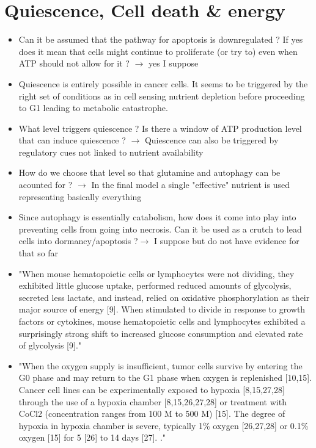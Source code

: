 \documentclass[11pt,a4paper]{article}
\begin{document}
\section{Quiescence, Cell death \& energy}
\begin{itemize}
\item Can it be assumed that the pathway for apoptosis is downregulated ? If yes does it mean that cells might continue to proliferate (or try to) even when ATP should not allow for it ? $\rightarrow$ yes I suppose
\item Quiescence is entirely possible in cancer cells. It seems to be triggered by the right set of conditions as in cell sensing nutrient depletion before proceeding to G1 leading to metabolic catastrophe.
\item What level triggers quiescence ? Is there a window of ATP production level that can induce quiescence ? $\rightarrow$ Quiescence can also be triggered by regulatory cues not linked to nutrient availability
\item How do we choose that level so that glutamine and autophagy can be acounted for ? $\rightarrow$ In the final model a single "effective" nutrient is used representing basically everything
\item Since autophagy is essentially catabolism, how does it come into play into preventing cells from going into necrosis. Can it be used as a crutch to lead cells into dormancy/apoptosis ?$\rightarrow$ I suppose but do not have evidence for that so far

\item "When mouse hematopoietic cells or lymphocytes were not dividing, they exhibited little glucose uptake, performed reduced amounts of glycolysis, secreted less lactate, and instead, relied on oxidative phosphorylation as their major source of energy [9]. When stimulated to divide in response to growth factors or cytokines, mouse hematopoietic cells and lymphocytes exhibited a surprisingly strong shift to increased glucose consumption and elevated rate of glycolysis [9]."\cite{Coller2019}

\item "When the oxygen supply is insufficient, tumor cells survive by entering the G0 phase and may return to the G1 phase when oxygen is replenished [10,15]. Cancer cell lines can be experimentally exposed to hypoxia [8,15,27,28] through the use of a hypoxia chamber [8,15,26,27,28] or treatment with CoCl2 (concentration ranges from 100 \textmu M to 500 \textmu M) [15]. The degree of hypoxia in hypoxia chamber is severe, typically 1\% oxygen [26,27,28] or 0.1\% oxygen [15] for 5 [26] to 14 days [27]. ."\cite{Nabil2021}


\end{itemize}
\end{document}
